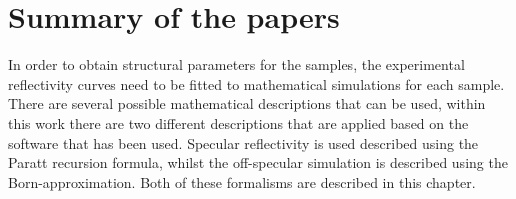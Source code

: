 \chapter{Summary of the papers}
In order to obtain structural parameters for the samples, the experimental reflectivity curves need to be fitted to mathematical simulations for each sample. There are several possible mathematical descriptions that can be used, within this work there are two different descriptions that are applied based on the software that has been used. Specular reflectivity is used described using the Paratt recursion formula, whilst the off-specular simulation is described using the Born-approximation. Both of these formalisms are described in this chapter.